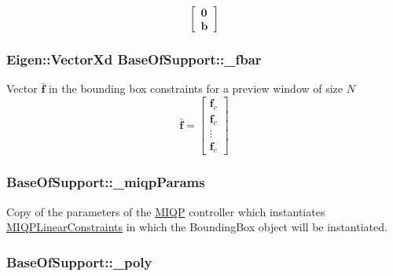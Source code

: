 \[ \left[ \begin{array}{c} \mathbf{0}\\ \mathbf{b} \end{array}\right] \] \hypertarget{classBaseOfSupport_aa578314a7473867f545b95883beb6c6b}{
\subsubsection[{\-\_\-fbar}]{\setlength{\rightskip}{0pt plus 5cm}\-Eigen\-::\-Vector\-Xd {\bf \-Base\-Of\-Support\-::\-\_\-fbar}}}\label{classBaseOfSupport_aa578314a7473867f545b95883beb6c6b}
\-Vector $\bar{\mathbf{f}}$ in the bounding box constraints for a preview window of size $N$ \[ \bar{\mathbf{f}} = \left[\begin{array}{c} \mathbf{f}_c\\ \mathbf{f}_c\\ \vdots\\ \mathbf{f}_c \end{array}\right] \] \hypertarget{classBaseOfSupport_a82f86511c236d038f1670dd515e53a8f}{
\subsubsection[{\-\_\-miqp\-Params}]{ {\bf \-Base\-Of\-Support\-::\-\_\-miqp\-Params}}}\label{classBaseOfSupport_a82f86511c236d038f1670dd515e53a8f}
\-Copy of the parameters of the \hyperlink{namespaceMIQP}{\-M\-I\-Q\-P} controller which instantiates \hyperlink{classMIQPLinearConstraints}{\-M\-I\-Q\-P\-Linear\-Constraints} in which the \-Bounding\-Box object will be instantiated. \hypertarget{classBaseOfSupport_a7e9b4ef515f90e2a7012871e7287bf5e}{
\subsubsection[{\-\_\-poly}]{ {\bf \-Base\-Of\-Support\-::\-\_\-poly}}}\label{classBaseOfSupport_a7e9b4ef515f90e2a7012871e7287bf5e}
